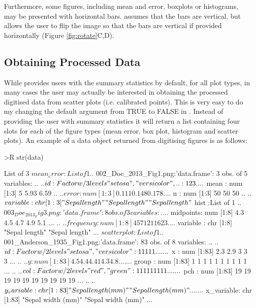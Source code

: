 \documentclass[article]{jss}
\newcommand{\fct}[1]{\code{#1()}}
\begin{document}
Furthermore, some figures, including mean and error, boxplots or histograms, may be presented with horizontal bars. \fct{metaDigitise} assumes that the bars are vertical, but allows the user to flip the image so that the bars are vertical if provided horizontally (Figure \ref{fig:rotate}C,D).

\subsection{Obtaining Processed Data}

While \fct{metaDigitise} provides users with the summary statistics by default, for all plot types, in many cases the user may actually be interested in obtaining the processed digitised data from scatter plots (i.e. calibrated points). This is very easy to do my changing the default  argument from TRUE to FALSE in \fct{metaDigitise}. Instead of providing the user with summary statistics it will return a list containing four slots for each of the figure types (mean error, box plot, histogram and scatter plots). An example of a data object returned from digitising figures is as follows:

\begin{CodeChunk}

\begin{CodeInput}
>R str(data)
\end{CodeInput}

\begin{CodeOutput}
List of 3
 $ mean_error :List of 1
  ..$ 002_Doe_2013_Fig1.png:'data.frame': 3 obs. of  5 variables:
  .. ..$ id      : Factor w/ 3 levels "setosa","versicolor",..: 1 2 3
  .. ..$ mean    : num [1:3] 5 5.93 6.59
  .. ..$ error   : num [1:3] 0.111 0.148 0.178
  .. ..$ n       : num [1:3] 50 50 50
  .. ..$ variable: chr [1:3] "Sepal length" "Sepal length" "Sepal length"
 $ hist       :List of 1
  ..$ 003_Doe_2013_Fig3.png:'data.frame': 8 obs. of  3 variables:
  .. ..$ midpoints: num [1:8] 4.3 4.5 4.7 4.9 5.1 ...
  .. ..$ frequency: num [1:8] 4 5 7 12 11 6 2 3
  .. ..$ variable : chr [1:8] "Sepal length" "Sepal length" ...
 $ scatterplot:List of 1
  ..$ 001_Anderson_1935_Fig1.png:'data.frame':  83 obs. of  8 variables:
  .. ..$ id        : Factor w/ 2 levels "setosa","versicolor": 1 1 1 1 1 ...
  .. ..$ x         : num [1:83] 2.3 2.9 3 3 3 ...
  .. ..$ y         : num [1:83] 4.5 4.4 4.41 4.3 4.8 ...
  .. ..$ group     : num [1:83] 1 1 1 1 1 1 1 1 1 1 ...
  .. ..$ col       : Factor w/ 2 levels "red","green": 1 1 1 1 1 1 1 1 1 ...
  .. ..$ pch       : num [1:83] 19 19 19 19 19 19 19 19 19 19 ...
  .. ..$ y_variable: chr [1:83] "Sepal length (mm)" "Sepal length (mm)"  ...
  .. ..$ x_variable: chr [1:83] "Sepal width (mm)" "Sepal width (mm)"    ...
\end{CodeOutput}
\end{CodeChunk}
\end{document}
